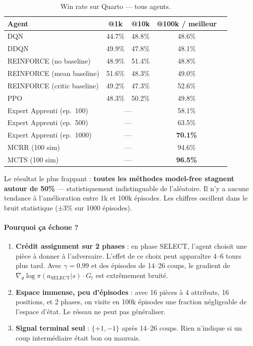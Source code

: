 \documentclass[12pt,a4paper]{article}
\begin{document}
\begin{table}[H]
\centering
\caption{Win rate sur Quarto — tous agents.}
\begin{tabular}{lcccc}
\toprule
\textbf{Agent} & \textbf{@1k} & \textbf{@10k} & \textbf{@100k / meilleur} \\
\midrule
DQN & 44.7\% & 48.8\% & 48.6\% \\
DDQN & 49.9\% & 47.8\% & 48.1\% \\
REINFORCE (no baseline) & 48.9\% & 51.4\% & 48.8\% \\
REINFORCE (mean baseline) & 51.6\% & 48.3\% & 49.0\% \\
REINFORCE (critic baseline) & 49.2\% & 47.3\% & 52.6\% \\
PPO & 48.3\% & 50.2\% & 49.8\% \\
\midrule
Expert Apprenti (ep.\ 100) & \multicolumn{2}{c}{—} & 58.1\% \\
Expert Apprenti (ep.\ 500) & \multicolumn{2}{c}{—} & 63.5\% \\
Expert Apprenti (ep.\ 1000) & \multicolumn{2}{c}{—} & \textbf{70.1\%} \\
\midrule
MCRR (100 sim) & \multicolumn{2}{c}{—} & 94.6\% \\
MCTS (100 sim) & \multicolumn{2}{c}{—} & \textbf{96.5\%} \\
\bottomrule
\end{tabular}
\end{table}

Le résultat le plus frappant : \textbf{toutes les méthodes model-free stagnent autour de 50\%} — statistiquement indistinguable de l'aléatoire. Il n'y a aucune tendance à l'amélioration entre 1k et 100k épisodes. Les chiffres oscillent dans le bruit statistique (±3\% sur 1000 épisodes).

\paragraph{Pourquoi ça échoue ?}

\begin{enumerate}
  \item \textbf{Crédit assignment sur 2 phases} : en phase SELECT, l'agent choisit une pièce à donner à l'adversaire. L'effet de ce choix peut apparaître 4--6 tours plus tard. Avec $\gamma = 0.99$ et des épisodes de 14--26 coups, le gradient de $\nabla_\theta \log \pi(a_\text{SELECT}|s) \cdot G_t$ est extrêmement bruité.

  \item \textbf{Espace immense, peu d'épisodes} : avec 16 pièces à 4 attributs, 16 positions, et 2 phases, on visite en 100k épisodes une fraction négligeable de l'espace d'état. Le réseau ne peut pas généraliser.

  \item \textbf{Signal terminal seul} : $\{+1, -1\}$ après 14--26 coups. Rien n'indique si un coup intermédiaire était bon ou mauvais.
\end{enumerate}
\end{document}
